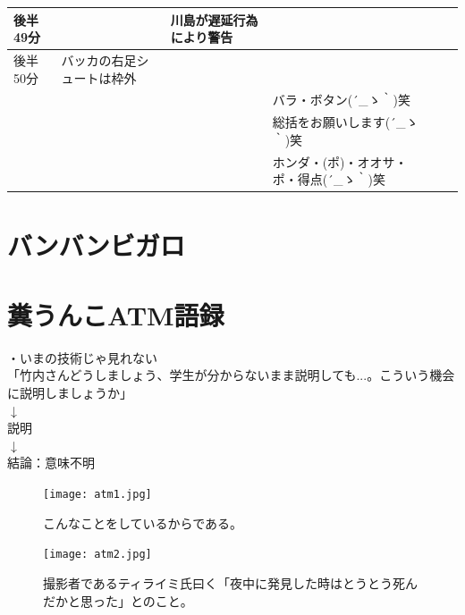 \begin{table}[htb]
{\begin{tabular}{|l|l|l|l|l|l|}
      後半49分  &                                              & 川島が遅延行為により警告              & \\ \hline
      後半50分  & バッカの右足シュートは枠外                   &                                       &  \\ \hline
                &                                              &                                       & バラ・ボタン\sf (´\_ゝ｀)笑 \\ \hline
                &                                              &                                       & 総括をお願いします\sf (´\_ゝ｀)笑 \\ \hline
                &                                              &                                       & ホンダ・(ポ)・オオサ・ポ・得点\sf (´\_ゝ｀)笑 \\ \hline
    \end{tabular}
    }
\end{table}


\newpage
\section{バンバンビガロ}
\newpage
\section{糞うんこATM語録}
・いまの技術じゃ見れない\\

「竹内さんどうしましょう、学生が分からないまま説明しても...。こういう機会に説明しましょうか」\\
      $\downarrow$\\
説明\\
       $\downarrow$\\
結論：意味不明

\begin{figure}[H]
  \centering
  \texttt{[image: atm1.jpg]}
  \caption{こんなことをしているからである。}
\label{atm1}
\end{figure}

\begin{figure}[H]
  \centering
  \texttt{[image: atm2.jpg]}
  \caption{撮影者であるティライミ氏曰く「夜中に発見した時はとうとう死んだかと思った」とのこと。}
\label{atm2}
\end{figure}

\newpage
